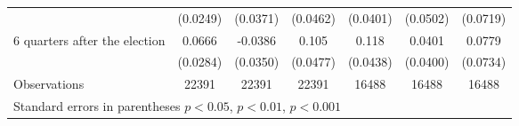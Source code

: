 \begin{table}[!ht]
\begin{tabular}{l*{6}{c}}
                    &    (0.0249)         &    (0.0371)         &    (0.0462)         &    (0.0401)         &    (0.0502)         &    (0.0719)         \\
[0.5em]
 6 quarters after the election&      0.0666\sym{*}  &     -0.0386         &       0.105\sym{*}  &       0.118\sym{**} &      0.0401         &      0.0779         \\
                    &    (0.0284)         &    (0.0350)         &    (0.0477)         &    (0.0438)         &    (0.0400)         &    (0.0734)         \\
\hline
Observations        &       22391         &       22391         &       22391         &       16488         &       16488         &       16488         \\
\hline\hline
\multicolumn{7}{l}{Standard errors in parentheses \sym{*} \(p<0.05\), \sym{**} \(p<0.01\), \sym{***} \(p<0.001\)}\\
\end{tabular}
\end{table}
